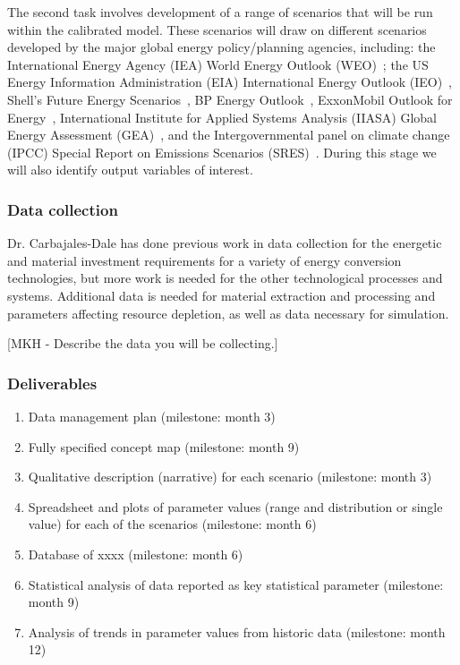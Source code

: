 \documentclass[11pt,a4paper]{article}
\begin{document}
The second task involves 
development of a range of scenarios 
that will be run within the calibrated model. 
These scenarios will draw on different scenarios 
developed by the major 
global energy policy/planning agencies, including: 
the International Energy Agency (IEA) World Energy Outlook (WEO)~\cite{IEA20xx}; 
the US Energy Information Administration (EIA) International Energy Outlook (IEO)~\cite{EIA20xx}, 
Shell's Future Energy Scenarios~\cite{Shell20xx}, 
BP Energy Outlook~\cite{BP20xx}, 
ExxonMobil Outlook for Energy~\cite{Exxon20xx}, 
International Institute for Applied Systems Analysis (IIASA) Global Energy Assessment (GEA)~\cite{IIASA2012}, and 
the Intergovernmental panel on climate change (IPCC)
Special Report on Emissions Scenarios (SRES)~\cite{IPCC2000}. 
During this stage we will also identify output variables of interest.

\subsubsection{Data collection}

Dr. Carbajales-Dale has done previous work in 
data collection for the energetic and material investment requirements 
for a variety of energy conversion technologies, 
but more work is needed for the other 
technological processes and systems. 
Additional data is needed for material extraction and processing
and parameters affecting resource depletion,
as well as data necessary for simulation.

[MKH - Describe the data you will be collecting.]


\subsubsection{Deliverables}
\begin{enumerate}
\vspace{-9pt}
\setlength{\itemsep}{-3pt}
	\item	Data management plan (milestone: month 3)
	\item	Fully specified concept map (milestone: month 9)
	\item	Qualitative description (narrative) for each scenario (milestone: month 3)
	\item	Spreadsheet and plots of parameter values 
				(range and distribution or single value) 
				for each of the scenarios (milestone: month 6)
	\item	Database of xxxx (milestone: month 6)
	\item	Statistical analysis of data reported as key statistical parameter (milestone: month 9)
	\item	Analysis of trends in parameter values from historic data (milestone: month 12)
\end{enumerate}
\end{document}
